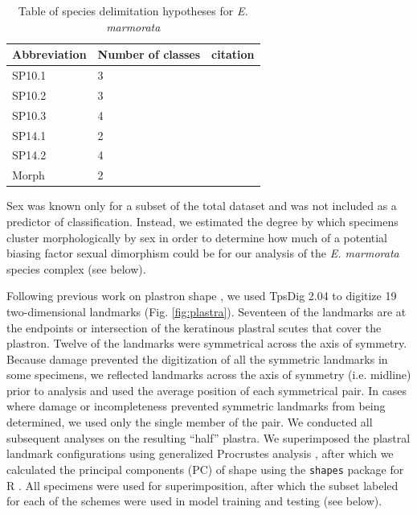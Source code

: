 \documentclass[fleqn,10pt,lineno]{wlpeerj} %
\begin{document}
\begin{table}
  \centering
    \caption{Table of species delimitation hypotheses for \textit{E. marmorata}}
    \begin{tabular}{l l l }
      \hline
      Abbreviation & Number of classes & citation \\
      \hline
      SP10.1 & 3 & \citet{Spinks2010} \\
      SP10.2 & 3 & \citet{Spinks2010} \\
      SP10.3 & 4 & \citet{Spinks2010} \\
      SP14.1 & 2 & \citet{Spinks2014} \\
      SP14.2 & 4 & \citet{Spinks2014} \\
      Morph & 2 & \citet{Spinks2010} \\
      \hline
    \end{tabular}
    \label{tab:hypotheses}
\end{table}

Sex was known only for a subset of the total dataset and was not included as a predictor of classification. Instead, we estimated the degree by which specimens cluster morphologically by sex in order to determine how much of a potential biasing factor sexual dimorphism could be for our analysis of the \textit{E. marmorata} species complex (see below).

Following previous work on plastron shape \citep{Angielczyk2007,Angielczyk2011,Angielczyk2013a}, we used TpsDig 2.04 \citep{Rohlf2005} to digitize 19 two-dimensional landmarks (Fig. \ref{fig:plastra}). Seventeen of the landmarks are at the endpoints or intersection of the keratinous plastral scutes that cover the plastron. Twelve of the landmarks were symmetrical across the axis of symmetry. Because damage prevented the digitization of all the symmetric landmarks in some specimens, we reflected landmarks across the axis of symmetry (i.e. midline) prior to analysis and used the average position of each symmetrical pair. In cases where damage or incompleteness prevented symmetric landmarks from being determined, we used only the single member of the pair. We conducted all subsequent analyses on the resulting ``half'' plastra. We superimposed the plastral landmark configurations using generalized Procrustes analysis \citep{Dryden1998a}, after which we calculated the principal components (PC) of shape using the \texttt{shapes} package for R \citep{R2016,Dryden2013}. All specimens were used for superimposition, after which the subset labeled for each of the schemes were used in model training and testing (see below).
\end{document}
